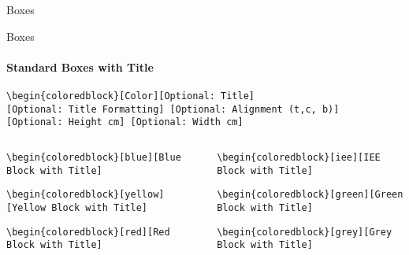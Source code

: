 \documentclass[aspectratio=169]{beamer}
\begin{document}
\begin{frame}{Boxes}
\end{frame}

\begin{frame}{Boxes}
    \framesubtitle{Standard Boxes with Title}

    \vspace{-.8cm}
    \begin{coloredblock}[grey]
        \footnotesize\centering\texttt{\textbackslash begin\{coloredblock\}[Color][Optional:~Title][Optional:~Title~Formatting] [Optional:~Alignment (t,c, b)][Optional:~Height~cm] [Optional:~Width~cm]}
    \end{coloredblock}

    \vspace{-1.1cm}
    \begin{columns}
        \begin{column}{0.49\textwidth}
    
            \begin{coloredblock}
                \footnotesize\texttt{\textbackslash begin\{coloredblock\}[blue][Blue Block with Title]}\strut
            \end{coloredblock}
    
            \begin{coloredblock}
                \footnotesize\texttt{\textbackslash begin\{coloredblock\}[yellow][Yellow Block with Title]}\strut
            \end{coloredblock}

            \begin{coloredblock}
                \footnotesize\texttt{\textbackslash begin\{coloredblock\}[red][Red Block with Title]}\strut
            \end{coloredblock}
        
        \end{column}
        \begin{column}{0.49\textwidth}
    
            \begin{coloredblock}
                \footnotesize\texttt{\textbackslash begin\{coloredblock\}[iee][IEE Block with Title]}\strut
            \end{coloredblock}
    
            \begin{coloredblock}
                \footnotesize\texttt{\textbackslash begin\{coloredblock\}[green][Green Block with Title]}\strut
            \end{coloredblock}
    
            \begin{coloredblock}
                \footnotesize\texttt{\textbackslash begin\{coloredblock\}[grey][Grey Block with Title]}\strut
            \end{coloredblock}
        \end{column}
    \end{columns}

\end{frame}
\end{document}
